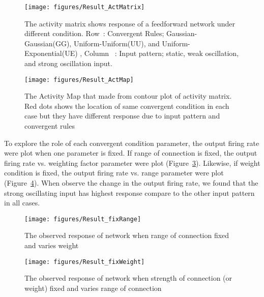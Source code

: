\begin{figure}[!h]
	\centering
	\texttt{[image: figures/Result\_ActMatrix]}
	\caption{The activity matrix shows response of a feedforward network under different condition. Row~: Convergent Rules; Gaussian-Gaussian(GG), Uniform-Uniform(UU), and Uniform-Exponential(UE) , Column ~: Input pattern; static, weak oscillation, and strong oscillation input.}
	\label{fig:ActivityMatrix}
\end{figure}

\begin{figure}[!h]
	\centering
	\texttt{[image: figures/Result\_ActMap]}
	\caption{The Activity Map that made from contour plot of activity matrix. Red dots shows the location of same convergent condition in each case but they have different response due to input pattern and convergent rules}
	\label{fig:ActivityMap}
\end{figure}


 To explore the role of each convergent condition parameter, the output firing rate were plot when one parameter is fixed.   If range of connection is fixed, the output  firing rate vs. weighting factor parameter were plot (Figure~\ref{fig:ObservedRfix}).  Likewise, if weight condition is fixed, the output  firing rate vs. range  parameter were plot (Figure~\ref{fig:ObservedWfix}). 
When observe the change in the output firing rate, we found that the strong oscillating input has highest response compare to the other input pattern in all cases.  


\begin{figure}[!h]
	\centering
	\texttt{[image: figures/Result\_fixRange]}
	\caption{The observed response of network when range of connection fixed and varies weight}
	\label{fig:ObservedRfix}
\end{figure}

\begin{figure}[!h]
	\centering
	\texttt{[image: figures/Result\_fixWeight]}
	\caption{The observed response of network when strength of connection (or weight) fixed and varies range of connection}
	\label{fig:ObservedWfix}
\end{figure}



